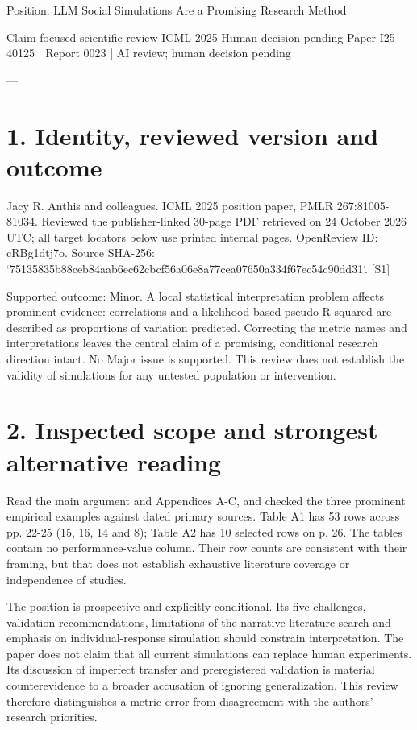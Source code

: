 \documentclass[10pt]{article}
\begin{document}
Position: LLM Social Simulations Are a Promising Research Method\par
Claim-focused scientific review ICML 2025 Human decision pending
Paper I25-40125 | Report 0023 | AI review; human decision pending\par
---\par
\section*{1. Identity, reviewed version and outcome}
Jacy R. Anthis and colleagues. ICML 2025 position paper, PMLR 267:81005-81034. Reviewed the publisher-linked 30-page PDF retrieved on 24 October 2026 UTC; all target locators below use printed internal pages. OpenReview ID: cRBg1dtj7o. Source SHA-256: `75135835b88ceb84aab6ec62cbcf56a06e8a77cea07650a334f67ec54c90dd31`. [S1]\par
Supported outcome: Minor. A local statistical interpretation problem affects prominent evidence: correlations and a likelihood-based pseudo-R-squared are described as proportions of variation predicted. Correcting the metric names and interpretations leaves the central claim of a promising, conditional research direction intact. No Major issue is supported. This review does not establish the validity of simulations for any untested population or intervention.\par
\section*{2. Inspected scope and strongest alternative reading}
Read the main argument and Appendices A-C, and checked the three prominent empirical examples against dated primary sources. Table A1 has 53 rows across pp. 22-25 (15, 16, 14 and 8); Table A2 has 10 selected rows on p. 26. The tables contain no performance-value column. Their row counts are consistent with their framing, but that does not establish exhaustive literature coverage or independence of studies.\par
The position is prospective and explicitly conditional. Its five challenges, validation recommendations, limitations of the narrative literature search and emphasis on individual-response simulation should constrain interpretation. The paper does not claim that all current simulations can replace human experiments. Its discussion of imperfect transfer and preregistered validation is material counterevidence to a broader accusation of ignoring generalization. This review therefore distinguishes a metric error from disagreement with the authors’ research priorities.\par
\end{document}
